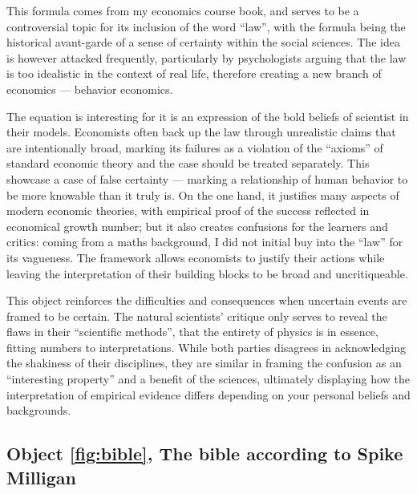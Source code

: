 \documentclass[a4paper,12pt]{article}
\begin{document}
This formula comes from my economics course book, and serves to be a controversial topic for its inclusion of the word ``law'', with the formula being the historical avant-garde of a sense of certainty within the social sciences. The idea is however attacked frequently, particularly by psychologists arguing that the law is too idealistic in the context of real life, therefore creating a new branch of economics --- behavior economics.

The equation is interesting for it is an expression of the bold beliefs of scientist in their models. Economists often back up the law through unrealistic claims that are intentionally broad, marking its failures as a violation of the ``axioms'' of standard economic theory and the case should be treated separately. This showcase a case of false certainty --- marking a relationship of human behavior to be more knowable than it truly is. On the one hand, it justifies many aspects of modern economic theories, with empirical proof of the success reflected in economical growth number; but it also creates confusions for the learners and critics: coming from a maths background, I did not initial buy into the ``law'' for its vagueness. The framework allows economists to justify their actions while leaving the interpretation of their building blocks to be broad and uncritiqueable.

This object reinforces the difficulties and consequences when uncertain events are framed to be certain. The natural scientists' critique only serves to reveal the flaws in their ``scientific methods'', that the entirety of physics is in essence, fitting numbers to interpretations. While both parties disagrees in acknowledging the shakiness of their disciplines, they are similar in framing the confusion as an ``interesting property'' and a benefit of the sciences, ultimately displaying how the interpretation of empirical evidence differs depending on your personal beliefs and backgrounds.

\subsection*{Object \ref{fig:bible}, The bible according to Spike Milligan}
\end{document}
